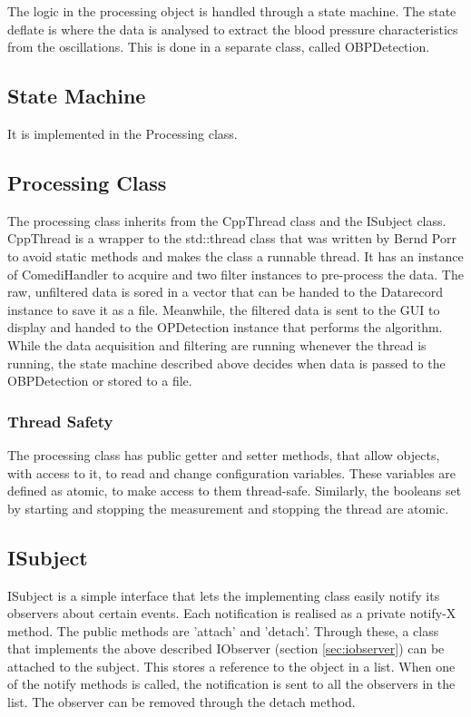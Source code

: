 The logic in the processing object is handled through a state machine.  The state deflate is where the data is analysed to extract the blood pressure characteristics from the oscillations. This is done in a separate class, called OBPDetection.

\subsection{State Machine}

It is implemented in the Processing class. 
\subsection{Processing Class} 
The processing class inherits from the CppThread class and the ISubject class. CppThread is a wrapper to the std::thread class that was written by Bernd Porr to avoid static methods and makes the class a runnable thread. It has an instance of ComediHandler to acquire and two filter instances to pre-process the data. The raw, unfiltered data is sored in a vector that can be handed to the Datarecord instance to save it as a file. Meanwhile, the filtered data is sent to the GUI to display and handed to the OPDetection instance that performs the algorithm. While the data acquisition and filtering are running whenever the thread is running, the state machine described above decides when data is passed to the OBPDetection or stored to a file. 

\subsubsection{Thread Safety}
The processing class has public getter and setter methods, that allow objects, with access to it, to read and change configuration variables. These variables are defined as atomic, to make access to them thread-safe. Similarly, the booleans set by starting and stopping the measurement and stopping the thread are atomic.

\subsection{ISubject}
ISubject is a simple interface that lets the implementing class easily notify its observers about certain events. Each notification is realised as a private notify-X method. The public methods are 'attach' and 'detach'. Through these, a class that implements the above described IObserver (section \ref{sec:iobserver}) can be attached to the subject. This stores a reference to the object in a list. When one of the notify methods is called, the notification is sent to all the observers in the list. The observer can be removed through the detach method. 


